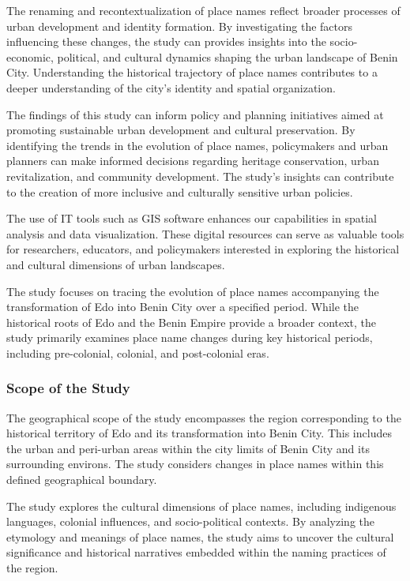 The renaming and recontextualization of place names reflect broader processes of urban development and identity formation. By investigating the factors influencing these changes, the study can provides insights into the socio-economic, political, and cultural dynamics shaping the urban landscape of Benin City. Understanding the historical trajectory of place names contributes to a deeper understanding of the city's identity and spatial organization.


The findings of this study can inform policy and planning initiatives aimed at promoting sustainable urban development and cultural preservation. By identifying the trends in the evolution of place names, policymakers and urban planners can make informed decisions regarding heritage conservation, urban revitalization, and community development. The study's insights can contribute to the creation of more inclusive and culturally sensitive urban policies.


The use of IT tools such as GIS software enhances our capabilities in spatial analysis and data visualization. These digital resources can serve as valuable tools for researchers, educators, and policymakers interested in exploring the historical and cultural dimensions of urban landscapes.


The study focuses on tracing the evolution of place names accompanying the transformation of Edo into Benin City over a specified period. While the historical roots of Edo and the Benin Empire provide a broader context, the study primarily examines place name changes during key historical periods, including pre-colonial, colonial, and post-colonial eras.
\subsubsection{Scope of the Study}
The geographical scope of the study encompasses the region corresponding to the historical territory of Edo and its transformation into Benin City. This includes the urban and peri-urban areas within the city limits of Benin City and its surrounding environs. The study considers changes in place names within this defined geographical boundary.


The study explores the cultural dimensions of place names, including indigenous languages, colonial influences, and socio-political contexts. By analyzing the etymology and meanings of place names, the study aims to uncover the cultural significance and historical narratives embedded within the naming practices of the region.


